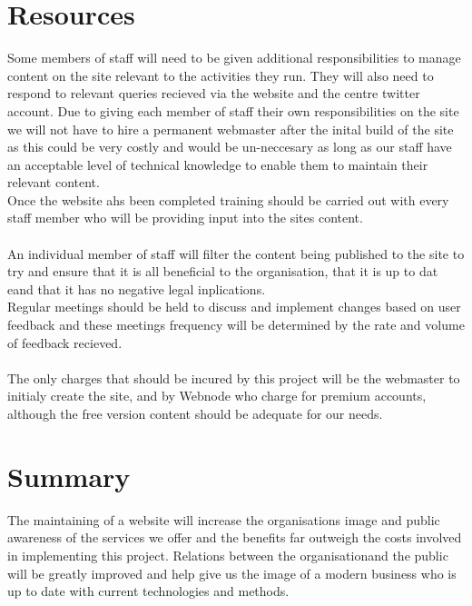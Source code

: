 \documentclass{article}
\begin{document}
\section{Resources}
Some members of staff will need to be given additional responsibilities to manage content on the site relevant to the activities they run.  They will also need to respond to relevant queries recieved via the website and the centre twitter account.  Due to giving each member of staff their own responsibilities on the site we will not have to hire a permanent webmaster after the inital build of the site as this could be very costly and would be un-neccesary as long as our staff have an acceptable level of technical knowledge to enable them to maintain their relevant content.
\\Once the website ahs been completed training should be carried out with every staff member who will be providing input into the sites content.
\\\\An individual member of staff will filter the content being published to the site to try and ensure that it is all beneficial to the organisation, that it is up to dat eand that it has no negative legal inplications.
\\Regular meetings should be held to discuss and implement changes based on user feedback and these meetings frequency will be determined by the rate and volume of feedback recieved.
\\\\The only charges that should be incured by this project will be the webmaster to initialy create the site, and by Webnode who charge for premium accounts, although the free version content should be adequate for our needs.

\section{Summary}
The maintaining of a website will increase the organisations image and public awareness of the services we offer and the benefits far outweigh the costs involved in implementing this project.  Relations between the organisationand the public will be greatly improved and help give us the image of a modern business who is up to date with current technologies and methods.
\newpage
\end{document}
